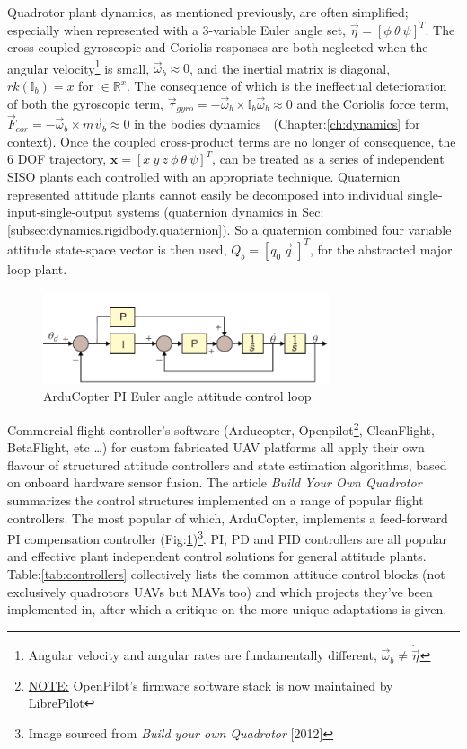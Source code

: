 \par
Quadrotor plant dynamics, as mentioned previously, are often simplified; especially when represented with a 3-variable Euler angle set, $\vec{\eta} = [\phi ~\theta ~\psi]^T$. The cross-coupled gyroscopic and Coriolis responses are both neglected when the angular velocity\footnote{Angular velocity and angular rates are fundamentally different, $\vec{\omega}_b\not=\dot{\vec{\eta}}$} is small, $\vec{\omega}_b \approx 0$, and the inertial matrix is diagonal, $rk(\mathbb{I}_b)= x$ for $\in\mathbb{R}^x$. The consequence of which is the ineffectual deterioration of both the gyroscopic term, $\vec{\tau}_{gyro}=-\vec{\omega}_b \times \mathbb{I}_b\vec{\omega}_b \approx 0$ and the  Coriolis force term, $\vec{F}_{cor}=-\vec{\omega}_b \times m\vec{v}_b \approx 0$ in the bodies dynamics~~(Chapter:\ref{ch:dynamics} for context). Once the coupled cross-product terms are no longer of consequence, the 6 DOF trajectory, $\mathbf{x}=[x ~y ~z ~\phi ~\theta ~\psi]^T$, can be treated as a series of independent SISO plants each controlled with an appropriate technique. Quaternion represented attitude plants cannot easily be decomposed into individual single-input-single-output systems (quaternion dynamics in Sec:\ref{subsec:dynamics.rigidbody.quaternion}). So a quaternion combined four variable attitude state-space vector is then used, $Q_b = [q_0 ~\vec{q}\>]^T$, for the abstracted major loop plant.
\par
\begin{figure}[hbtp]
\centering
\includegraphics[width=0.75\textwidth]{figs/arducopter-pi}
\caption{ArduCopter PI Euler angle attitude control loop}
\label{fig:arducopter-pi}
\end{figure}
\vspace{-10pt}
Commercial flight controller's software (Arducopter\cite{arducoptersite}, Openpilot\cite{openpilotsite}\footnote{\underline{NOTE:} OpenPilot's firmware software stack is now maintained by LibrePilot}, CleanFlight\cite{cleanflight}, BetaFlight\cite{betaflight}, etc \ldots) for custom fabricated UAV platforms all apply their own flavour of structured attitude controllers and state estimation algorithms, based on onboard hardware sensor fusion. The article \emph{Build Your Own Quadrotor}\cite{buildyourownquad} summarizes the control structures implemented on a range of popular flight controllers. The most popular of which, ArduCopter, implements a feed-forward PI compensation controller (Fig:\ref{fig:arducopter-pi})\footnote{Image sourced from \emph{Build your own Quadrotor} [2012]\cite{buildyourownquad}}.  PI, PD and PID controllers are all popular and effective plant independent control solutions for general attitude plants. Table:\ref{tab:controllers} collectively lists the common attitude control blocks (not exclusively quadrotors UAVs but MAVs too) and which projects they've been implemented in, after which a critique on the more unique adaptations is given.
